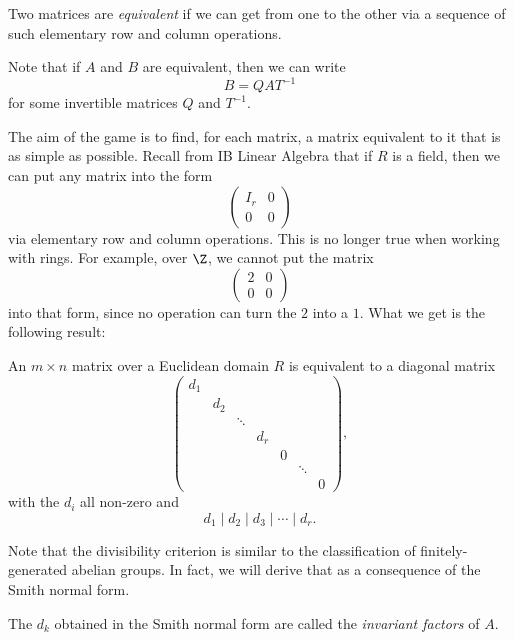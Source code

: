 \documentclass[a4paper]{article}
\begin{document}
\begin{defi}
  Two matrices are \emph{equivalent} if we can get from one to the other via a sequence of such elementary row and column operations.
\end{defi}

Note that if $A$ and $B$ are equivalent, then we can write
\[
  B = QAT^{-1}
\]
for some invertible matrices $Q$ and $T^{-1}$.

The aim of the game is to find, for each matrix, a matrix equivalent to it that is as simple as possible. Recall from IB Linear Algebra that if $R$ is a field, then we can put any matrix into the form
\[
  \begin{pmatrix}
    I_r & 0\\
    0 & 0
  \end{pmatrix}
\]
via elementary row and column operations. This is no longer true when working with rings. For example, over $\Z$, we cannot put the matrix
\[
  \begin{pmatrix}
    2 & 0\\
    0 & 0
  \end{pmatrix}
\]
into that form, since no operation can turn the $2$ into a $1$. What we get is the following result:
\begin{thm}
  An $m \times n$ matrix over a Euclidean domain $R$ is equivalent to a diagonal matrix
  \[
    \begin{pmatrix}
      d_1\\
      & d_2\\
      & & \ddots\\
      & & & d_r\\
      & & & & 0\\
      & & & & & \ddots\\
      & & & & & & 0
    \end{pmatrix},
  \]
  with the $d_i$ all non-zero and
  \[
    d_1 \mid d_2 \mid d_3 \mid \cdots \mid d_r.
  \]
\end{thm}
Note that the divisibility criterion is similar to the classification of finitely-generated abelian groups. In fact, we will derive that as a consequence of the Smith normal form.

\begin{defi}
  The $d_k$ obtained in the Smith normal form are called the \emph{invariant factors} of $A$.
\end{defi}
\end{document}
